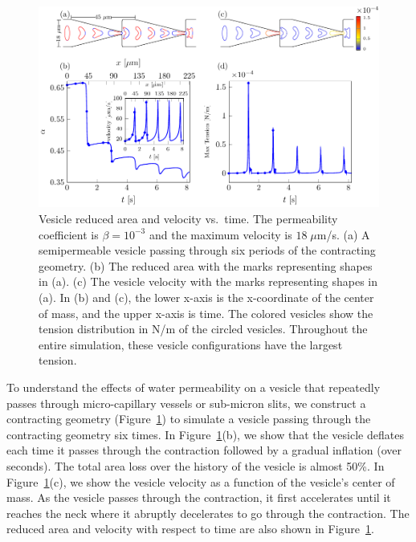 \documentclass[prb,preprint,showpacs,preprintnumbers,amsmath,amssymb,longbibliography]{revtex4-1}
\newif\ifTikz
\begin{document}
\begin{figure}[hbp]
  \centering
  \ifTikz
  
  \else
  \includegraphics{figures/contractingComposite2.pdf}
  \fi
  \caption{\label{fig:contractingComposite2} Vesicle reduced area and
  velocity vs.~time. The permeability coefficient is $\beta = 10^{-3}$
  and the maximum velocity is $18\;\mu$m/s. (a) A semipermeable vesicle
  passing through six periods of the contracting geometry. (b) The
  reduced area with the marks representing shapes in (a). (c) The
  vesicle velocity with the marks representing shapes in (a). In (b) and
  (c), the lower x-axis is the x-coordinate of the center of mass, and
  the upper x-axis is time. The colored vesicles show the tension
  distribution in N/m of the circled vesicles. Throughout the entire
  simulation, these vesicle configurations have the largest tension.}
\end{figure}
To understand the effects of water permeability on a vesicle that
repeatedly passes through micro-capillary vessels or sub-micron slits,
we construct a contracting geometry
(Figure~\ref{fig:contractingComposite2}) to simulate a vesicle passing
through the contracting geometry six times.  In
Figure~\ref{fig:contractingComposite2}(b), we show that the vesicle
deflates each time it passes through the contraction followed by a
gradual inflation (over seconds). The total area loss over the history
of the vesicle is almost 50\%. In
Figure~\ref{fig:contractingComposite2}(c), we show the vesicle velocity
as a function of the vesicle's center of mass. As the vesicle passes
through the contraction, it first accelerates until it reaches the neck
where it abruptly decelerates to go through the contraction. The reduced
area and velocity with respect to time are also shown in
Figure~\ref{fig:contractingComposite2}.
\end{document}

